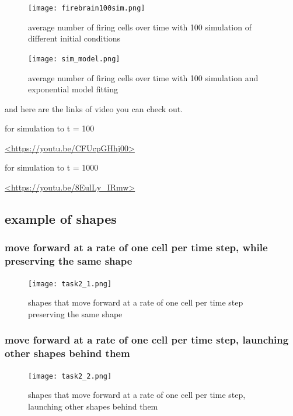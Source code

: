 \documentclass[12pt]{article}
\begin{document}
\begin{figure}[H] %
\centering
\texttt{[image: firebrain100sim.png]}
\caption{average number of firing cells over time with 100 simulation of different initial conditions}
\label{fig:100sim}
\end{figure}

\begin{figure}[H] %
\centering
\texttt{[image: sim\_model.png]}
\caption{average number of firing cells over time with 100 simulation and exponential model fitting}
\label{fig:sim_model}
\end{figure}

and here are the links of video you can check out.\par 
for simulation to t = 100\par
\url{<https://youtu.be/CFUcpGHhj00>}\par
for simulation to t = 1000\par
\url{<https://youtu.be/8EulLy_IRmw>}\par




\subsection{example of shapes}

\subsubsection{move forward at a rate of one cell per time step, while preserving the same shape}
\begin{figure}[H] %
\centering
\texttt{[image: task2\_1.png]}
\caption{shapes that move forward at a rate of one cell per time step preserving the same shape}
\label{fig:task2_1}
\end{figure}

\subsubsection{move forward at a rate of one cell per time step, launching other shapes behind them}
\begin{figure}[H] %
\centering
\texttt{[image: task2\_2.png]}
\caption{shapes that move forward at a rate of one cell per time step, launching other shapes behind them}
\label{fig:task2_2}
\end{figure}
\end{document}
